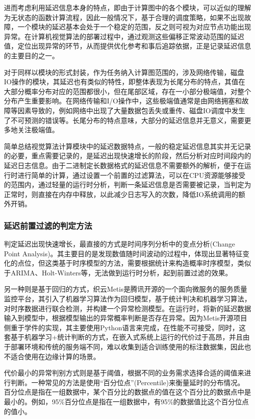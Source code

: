\documentclass[master]{shtthesis}
\begin{document}
进而考虑利用延迟信息本身的特点，即由于计算图中的各个模块，可以近似的理解为无状态的函数计算流程，因此一般情况下，基于合理的调度策略，如果不出现故障，一个模块的延迟基本会处于一个稳定的范围，反之则可视为对应节点功能出现异常。在计算机视觉算法的部署过程中，通过观测这些偏移正常波动范围的延迟值，定位出现异常的环节，从而提供优化参考和事后追踪依据，正是记录延迟信息的主要目的之一。

对于同样以模块的形式封装，作为任务纳入计算图范围的，涉及网络传输，磁盘IO操作的模块，其延迟也有类似的特性，即整体表现为长尾分布的特点\cite{dean2013tail}，其值在大部分概率分布对应的范围都很小，但在尾部区域，存在一小部分极端值，对整个分布产生重要影响。在网络传输和I/O操作中，这些极端值通常是由网络拥塞和故障等因素导致的，例如网络中出现了大量数据包丢失或重传、磁盘IO调度中发生了不可预测的错误等。长尾分布的特点意味，大部分的延迟信息并无意义，需要更多地关注极端值。

简单总结视觉算法计算模块中的延迟数据特点，一般的稳定延迟信息其实并无记录的必要，重点需要记录的，是延迟出现快速增长的阶段，然后分析对应时间段内的延迟日志信息。由于二进制定长数据格式的延迟信息不需要额外的解析，便于在运行时进行简单的计算，通过设置一个前置的过滤算法，可以在CPU资源能够接受的范围内，通过轻量的运行时分析，判断一条延迟信息是否需要被记录，当判定为正常时，则直接在内存中释放，以此减少日志写入的次数，降低IO系统调用的额外开销。

\subsubsection{延迟前置过滤的判定方法}\label{延迟前置过滤的判定方法}
判定延迟出现快速增长，最直接的方式是时间序列分析中的变点分析(Change Point Analysis)。其主要目的是发现数值随时间波动的过程中，体现出显著特征变化的点位，但这类基于时序模型的方法，需要根据统计来构造概率时序模型，类似于ARIMA\cite{kalpakis2001distance}、Holt-Winters\cite{chatfield1988holt}等，无法做到运行时分析，起到前置过滤的效果。

另一种则是基于回归的方式，织云Metis\cite{xia2019anomaly}是腾讯开源的一个面向微服务的服务质量监控平台，其引入了机器学习算法作为回归模型，基于统计判决和机器学习算法，对时序数据进行联合检测，并构建一个异常检测模型。在运行时，将新的延迟数据输入到模型中，根据模型输出的异常概率判断是否存在异常。因为Metis开源项目侧重于学件的实现，其主要使用Python语言来完成，在性能不可接受，同时，这套基于机器学习+统计判断的方式，在嵌入式系统上运行的代价过于高昂，并且由于部署环境和传统的服务端不同，难以收集到适合训练使用的标注数据集，因此也不适合使用在边缘计算的场景。

代价最小的异常判别方式则是基于阈值，根据不同的业务需求选择合适的阈值来进行判断。一种常见的方法是使用“百分位点”(Percentile)来衡量延时的分布情况。百分位点是指在一组数据中，某个百分比的数据点的值在这个百分比的数据点中是最小的。例如，95$\%$百分位点是指在一组数据中，有95$\%$的数据值比这个百分位点的值小。
\end{document}
